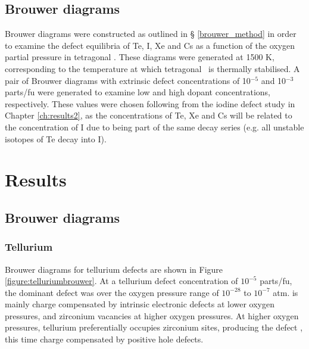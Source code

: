 

\subsection{Brouwer diagrams}

Brouwer diagrams were constructed as outlined in § \ref{brouwer_method} in order to examine the defect equilibria of Te, I, Xe and Cs as a function of the oxygen partial pressure in tetragonal \zirconia . These diagrams were generated at 1500 K, corresponding to the temperature at which tetragonal \zirconia\ is thermally stabilised. A pair of Brouwer diagrams with extrinsic defect concentrations of 10$^{-5}$ and 10$^{-3}$ parts/fu were generated to examine low and high dopant concentrations, respectively. These values were chosen following from the iodine defect study in Chapter \ref{ch:results2}, as the concentrations of Te, Xe and Cs will be related to the concentration of I due to being part of the same decay series (e.g. all unstable isotopes of Te decay into I).

\section{Results} \label{Results}

\subsection{Brouwer diagrams}

\subsubsection{Tellurium}

Brouwer diagrams for tellurium defects are shown in Figure \ref{figure:telluriumbrouwer}. At a tellurium defect concentration of $10^{-5}$ parts/fu, the dominant defect was  over the oxygen pressure range of $10^{-28}$ to $10^{-7}$ atm.  is mainly charge compensated by intrinsic electronic defects at lower oxygen pressures, and zirconium vacancies at higher oxygen pressures. At higher oxygen pressures, tellurium preferentially occupies zirconium sites, producing the defect , this time charge compensated by positive hole defects. 

